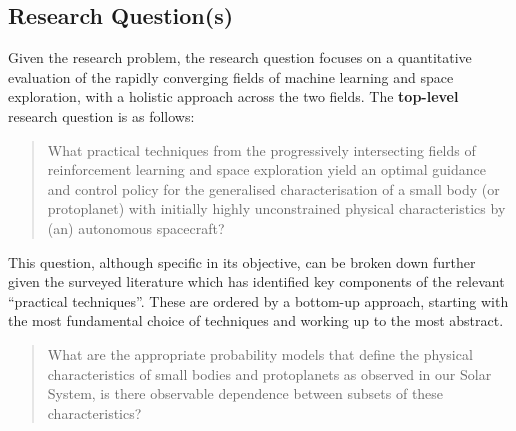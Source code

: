 \begin{quote}
    
\end{quote}

\newpage\subsection{Research Question(s)}

Given the research problem, the research question focuses on a quantitative evaluation of the rapidly converging fields of machine learning and space exploration, with a holistic approach across the two fields. The \textbf{top-level} research question is as follows:

\begin{quote}
    What practical techniques from the progressively intersecting fields of reinforcement learning and space exploration yield an optimal guidance and control policy for the generalised characterisation of a small body (or protoplanet) with initially highly unconstrained physical characteristics by (an) autonomous spacecraft?
\end{quote}

This question, although specific in its objective, can be broken down further given the surveyed literature which has identified key components of the relevant ``practical techniques''. These are ordered by a bottom-up approach, starting with the most fundamental choice of techniques and working up to the most abstract.
 
\begin{quote}
    What are the appropriate probability models that define the physical characteristics of small bodies and protoplanets as observed in our Solar System, is there observable dependence between subsets of these characteristics?
\end{quote}

